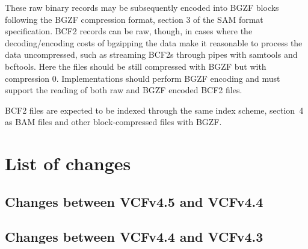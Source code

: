 \documentclass[8pt]{article}
\begin{document}
These raw binary records may be subsequently encoded into BGZF blocks following the BGZF compression format, section 3 of the SAM format specification.
BCF2 records can be raw, though, in cases where the decoding/encoding costs of bgzipping the data make it reasonable to process the data uncompressed, such as streaming BCF2s through pipes with samtools and bcftools.
Here the files should be still compressed with BGZF but with compression 0.
Implementations should perform BGZF encoding and must support the reading of both raw and BGZF encoded BCF2 files.

BCF2 files are expected to be indexed through the same index scheme, section~4 as BAM files and other block-compressed files with BGZF.

\section{List of changes}

\subsection{Changes between VCFv4.5 and VCFv4.4}

\begin{itemize}
\end{itemize}

\subsection{Changes between VCFv4.4 and VCFv4.3}
\end{document}
